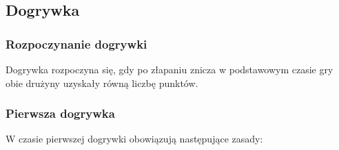 \documentclass[12pt]{article}
\begin{document}
\subsection{Dogrywka}

\subsubsection{Rozpoczynanie dogrywki} 
Dogrywka rozpoczyna się, gdy
po złapaniu znicza w podstawowym czasie gry obie drużyny uzyskały równą
liczbę punktów.

\subsubsection{Pierwsza dogrywka} 
W czasie pierwszej dogrywki
obowiązują następujące zasady:
\end{document}
